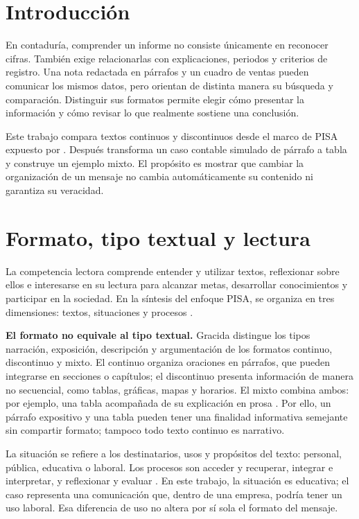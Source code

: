 


\section{Introducción}

En contaduría, comprender un informe no consiste únicamente en reconocer
cifras. También exige relacionarlas con explicaciones, periodos y criterios
de registro. Una nota redactada en párrafos y un cuadro de ventas pueden
comunicar los mismos datos, pero orientan de distinta manera su búsqueda y
comparación. Distinguir sus formatos permite elegir cómo presentar la
información y cómo revisar lo que realmente sostiene una conclusión.

Este trabajo compara textos continuos y discontinuos desde el marco de
PISA expuesto por \textcite{gracida2012}. Después transforma un caso
contable simulado de párrafo a tabla y construye un ejemplo mixto. El
propósito es mostrar que cambiar la organización de un mensaje no cambia
automáticamente su contenido ni garantiza su veracidad.

\section{Formato, tipo textual y lectura}

La competencia lectora comprende entender y utilizar textos, reflexionar
sobre ellos e interesarse en su lectura para alcanzar metas, desarrollar
conocimientos y participar en la sociedad. En la síntesis del enfoque PISA,
se organiza en tres dimensiones: textos, situaciones y procesos
\parencite[p.~3]{gracida2012}.

\textbf{El formato no equivale al tipo textual.} Gracida distingue los
tipos narración, exposición, descripción y argumentación de los formatos
continuo, discontinuo y mixto. El continuo organiza oraciones en párrafos,
que pueden integrarse en secciones o capítulos; el discontinuo presenta
información de manera no secuencial, como tablas, gráficas, mapas y
horarios. El mixto combina ambos: por ejemplo, una tabla acompañada de
su explicación en prosa \parencite[p.~3]{gracida2012}. Por ello, un
párrafo expositivo y una tabla pueden tener una finalidad informativa
semejante sin compartir formato; tampoco todo texto continuo es narrativo.

La situación se refiere a los destinatarios, usos y propósitos del texto:
personal, pública, educativa o laboral. Los procesos son acceder y
recuperar, integrar e interpretar, y reflexionar y evaluar
\parencite[p.~4]{gracida2012}. En este trabajo, la situación es educativa;
el caso representa una comunicación que, dentro de una empresa, podría
tener un uso laboral. Esa diferencia de uso no altera por sí sola el
formato del mensaje.

